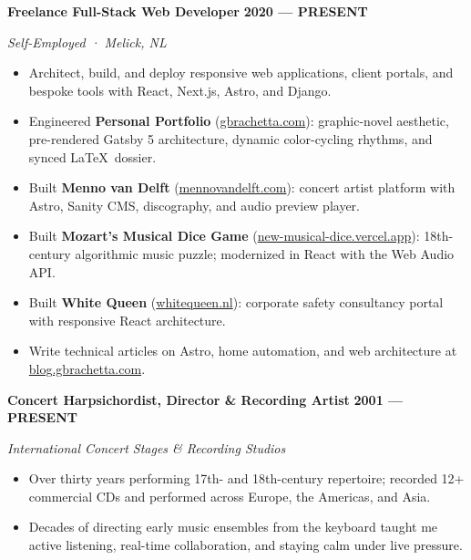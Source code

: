 \documentclass[a4paper]{article}
\begin{document}
\noindent
\textbf{\fontsize{8.7}{10.5}\selectfont Freelance Full-Stack Web Developer} \hfill \textbf{\fontsize{7.8}{9}\selectfont\color{accent} 2020 — PRESENT}\par
\vspace{1pt}
\noindent\textit{\fontsize{7.8}{9}\selectfont Self-Employed · Melick, NL}\par
\vspace{-2pt}
\begin{itemize}
  \item Architect, build, and deploy responsive web applications, client portals, and bespoke tools with React, Next.js, Astro, and Django.
  \item Engineered \textbf{Personal Portfolio} (\href{https://www.gbrachetta.com}{gbrachetta.com}): graphic-novel aesthetic, pre-rendered Gatsby 5 architecture, dynamic color-cycling rhythms, and synced \LaTeX\ dossier.
  \item Built \textbf{Menno van Delft} (\href{https://www.mennovandelft.com}{mennovandelft.com}): concert artist platform with Astro, Sanity CMS, discography, and audio preview player.
  \item Built \textbf{Mozart’s Musical Dice Game} (\href{https://new-musical-dice.vercel.app}{new-musical-dice.vercel.app}): 18th-century algorithmic music puzzle; modernized in React with the Web Audio API.
  \item Built \textbf{White Queen} (\href{https://www.whitequeen.nl}{whitequeen.nl}): corporate safety consultancy portal with responsive React architecture.
  \item Write technical articles on Astro, home automation, and web architecture at \href{https://blog.gbrachetta.com}{blog.gbrachetta.com}.
\end{itemize}

\vspace{2pt}
\noindent
\textbf{\fontsize{8.7}{10.5}\selectfont Concert Harpsichordist, Director \& Recording Artist} \hfill \textbf{\fontsize{7.8}{9}\selectfont\color{accent} 2001 — PRESENT}\par
\vspace{1pt}
\noindent\textit{\fontsize{7.8}{9}\selectfont International Concert Stages \& Recording Studios}\par
\vspace{-2pt}
\begin{itemize}
  \item Over thirty years performing 17th- and 18th-century repertoire; recorded 12+ commercial CDs and performed across Europe, the Americas, and Asia.
  \item Decades of directing early music ensembles from the keyboard taught me active listening, real-time collaboration, and staying calm under live pressure.
\end{itemize}
\end{document}
